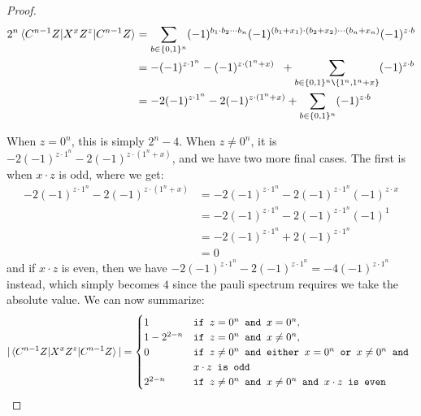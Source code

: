 \documentclass[12pt]{dalthesis}
\begin{document}
\begin{proof}
\begin{equation}
\begin{split}
2^n\braket{C^{n-1}Z|X^xZ^z|C^{n-1}Z} & = \sum\limits_{b \in \{0, 1\}^n} (-1)^{b_1 \cdot b_2 \cdots b_n} (-1)^{(b_1 + x_1) \cdot (b_2 + x_2) \cdots (b_n + x_n)} (-1)^{z \cdot b} \\
& = - (-1)^{z \cdot 1^n} - (-1)^{z \cdot (1^n + x)} \hspace{2mm} + \sum\limits_{b \in \{0, 1\}^n \texttt{\textbackslash} \{1^n, 1^n + x \} } (-1)^{z \cdot b}  \\
& = -2(-1)^{z \cdot 1^n} - 2(-1)^{z \cdot (1^n + x)} + \sum\limits_{b \in \{0, 1\}^n} (-1)^{z \cdot b}
\end{split}
\end{equation}

When $z = 0^n$, this is simply $2^n - 4$. When $z \neq 0^n$, it is $-2(-1)^{z \cdot 1^n} - 2(-1)^{z \cdot (1^n + x)}$, and we have two more final cases. The first is when $x \cdot z$ is odd, where we get:
\begin{equation}
\begin{split}
-2(-1)^{z \cdot 1^n} - 2(-1)^{z \cdot (1^n + x)} & = -2(-1)^{z \cdot 1^n} - 2(-1)^{z \cdot 1^n} (-1)^{z \cdot x} \\
& = -2(-1)^{z \cdot 1^n} - 2(-1)^{z \cdot 1^n} (-1)^1 \\
& = -2(-1)^{z \cdot 1^n} + 2(-1)^{z \cdot 1^n} \\
& = 0
\end{split}
\end{equation}
and if $x \cdot z$ is even, then we have $-2(-1)^{z \cdot 1^n} - 2(-1)^{z \cdot 1^n} = -4(-1)^{z \cdot 1^n}$ instead, which simply becomes $4$ since the pauli spectrum requires we take the absolute value. We can now summarize:
\begin{equation*}
|\braket{C^{n-1}Z|X^xZ^z|C^{n-1}Z}| = \begin{cases}
1 & \texttt{if } z = 0^n \texttt{ and } x = 0^n, \\
1 - 2^{2-n} & \texttt{if } z = 0^n \texttt{ and } x \neq 0^n, \\
0 & \texttt{if } z \neq 0^n \texttt{ and either } x = 0^n \texttt{ or } x \neq 0^n \texttt{ and } \\
& x \cdot z \texttt{ is odd} \\
2^{2-n} & \texttt{if } z \neq 0^n \texttt{ and } x \neq 0^n
 \texttt{ and } x \cdot z \texttt{ is even}
\end{cases}
\end{equation*}

\end{proof}
\end{document}
